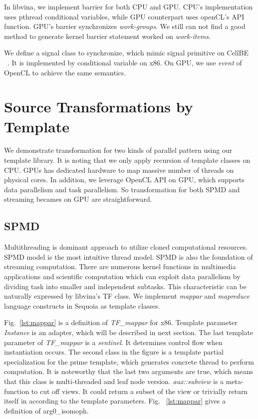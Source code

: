 \documentclass[10pt, conference, compsocconf]{IEEEtran}
\begin{document}
In libvina, we implement barrier for both CPU and GPU. CPU's
implementation uses pthread conditional variables, while GPU counterpart
uses openCL's API function. GPU's barrier synchronizes
\emph{work-groups}. We still can not find a good method to generate kernel
barrier statement worked on \emph{work-items}.

We define a signal class to synchronize, which mimic
signal primitive on CellBE ~\cite{cellnetwork}. It is implemented by
conditional variable on x86. On GPU, we use \emph{event} of OpenCL to
achieve the same semantics.

\section{Source Transformations by Template}
We demonstrate transformation for two kinds of parallel pattern using
our template library. It is noting that we only apply recursion of
template classes on CPU. GPUs has dedicated hardware to map massive
number of threads on physical cores. In addition, we leverage OpenCL API on GPU, which
supports data parallelism and task parallelism. So transformation for
both SPMD and streaming becames on GPU are straightforward.

\subsection{SPMD}
Multithreading is dominant approach to utilize cloned computational resources. SPMD model is the most intuitive thread model.  SPMD is also
the foundation of streaming computation. There are numerous kernel functions in
multimedia applications and scientific computation which can 
exploit data parallelism by dividing task into smaller and independent
subtasks. This characteristic can be naturally expressed by libvina's
TF class. We implement \emph{mappar} and \emph{mapreduce} language constructs in Sequoia as template classes.

Fig.~\ref{lst:mappar} is a definition of \emph{TF\_mappar} for
x86. Template parameter \emph{Instance} is an adapter, which will be
described in next section. The last template
parameter of \textit{TF\_mappar} is a \emph{sentinel}. It determines control flow when
instantiation occurs. The second class in the figure is a template partial
specialization for the prime template, which generates concrete thread
to perform computation. It is noteworthy that the last two arguments
are true, which means that this class is multi-threaded and
leaf node version. \textit{aux::subview} is a meta-function to cut off
views. It could return a subset of the view or trivially return itself
in according to the template parameters. Fig. ~\ref{lst:mappar}
gives a definition of arg0\_isomoph.
\end{document}
